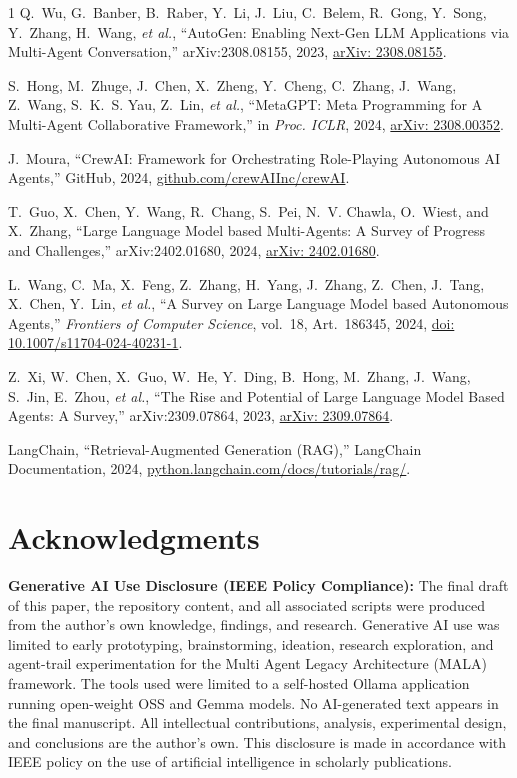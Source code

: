 \documentclass[conference]{IEEEtran}
\newcommand{\MALA}{Multi Agent Legacy Architecture (MALA)}
\begin{document}
\begin{thebibliography}{1}
Q.~Wu, G.~Banber, B.~Raber, Y.~Li, J.~Liu, C.~Belem, R.~Gong, Y.~Song, Y.~Zhang, H.~Wang, \emph{et al.},
``AutoGen: Enabling Next-Gen LLM Applications via Multi-Agent Conversation,''
arXiv:2308.08155, 2023,
\href{https://arxiv.org/abs/2308.08155}{arXiv: 2308.08155}.

S.~Hong, M.~Zhuge, J.~Chen, X.~Zheng, Y.~Cheng, C.~Zhang, J.~Wang, Z.~Wang, S.~K.~S. Yau, Z.~Lin, \emph{et al.},
``MetaGPT: Meta Programming for A Multi-Agent Collaborative Framework,''
in \emph{Proc. ICLR}, 2024,
\href{https://arxiv.org/abs/2308.00352}{arXiv: 2308.00352}.

J.~Moura,
``CrewAI: Framework for Orchestrating Role-Playing Autonomous AI Agents,''
GitHub, 2024,
\href{https://github.com/crewAIInc/crewAI}{github.com/crewAIInc/crewAI}.

T.~Guo, X.~Chen, Y.~Wang, R.~Chang, S.~Pei, N.~V. Chawla, O.~Wiest, and X.~Zhang,
``Large Language Model based Multi-Agents: A Survey of Progress and Challenges,''
arXiv:2402.01680, 2024,
\href{https://arxiv.org/abs/2402.01680}{arXiv: 2402.01680}.

L.~Wang, C.~Ma, X.~Feng, Z.~Zhang, H.~Yang, J.~Zhang, Z.~Chen, J.~Tang, X.~Chen, Y.~Lin, \emph{et al.},
``A Survey on Large Language Model based Autonomous Agents,''
\emph{Frontiers of Computer Science}, vol.~18, Art.~186345, 2024,
\href{https://doi.org/10.1007/s11704-024-40231-1}{doi: 10.1007/s11704-024-40231-1}.

Z.~Xi, W.~Chen, X.~Guo, W.~He, Y.~Ding, B.~Hong, M.~Zhang, J.~Wang, S.~Jin, E.~Zhou, \emph{et al.},
``The Rise and Potential of Large Language Model Based Agents: A Survey,''
arXiv:2309.07864, 2023,
\href{https://arxiv.org/abs/2309.07864}{arXiv: 2309.07864}.

LangChain,
``Retrieval-Augmented Generation (RAG),''
LangChain Documentation, 2024,
\href{https://python.langchain.com/docs/tutorials/rag/}{python.langchain.com/docs/tutorials/rag/}.

\end{thebibliography}

\section*{Acknowledgments}
\textbf{Generative AI Use Disclosure (IEEE Policy Compliance):}
The final draft of this paper, the repository content, and all associated scripts were produced from the author's own knowledge, findings, and research. Generative AI use was limited to early prototyping, brainstorming, ideation, research exploration, and agent-trail experimentation for the \MALA{} framework. The tools used were limited to a self-hosted Ollama application running open-weight OSS and Gemma models. No AI-generated text appears in the final manuscript. All intellectual contributions, analysis, experimental design, and conclusions are the author's own. This disclosure is made in accordance with IEEE policy on the use of artificial intelligence in scholarly publications.
\end{document}
